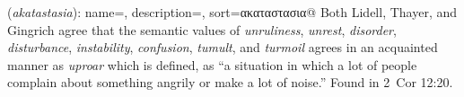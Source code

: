 \item[Uproar,]

(\textit{akatastasia}):
{
    name=,
    description={},
    sort=ακαταστασια@
}
Both Lidell, Thayer, and Gingrich agree that the semantic values of \emph{unruliness}, \emph{unrest}, \emph{disorder}, \emph{disturbance}, \emph{instability},  \emph{confusion}, \emph{tumult}, and \emph{turmoil} agrees in an acquainted manner as \emph{uproar} which is defined, as ``a situation in which a lot of people complain about something angrily or make a lot of noise.''
Found in 2~Cor 12:20.
